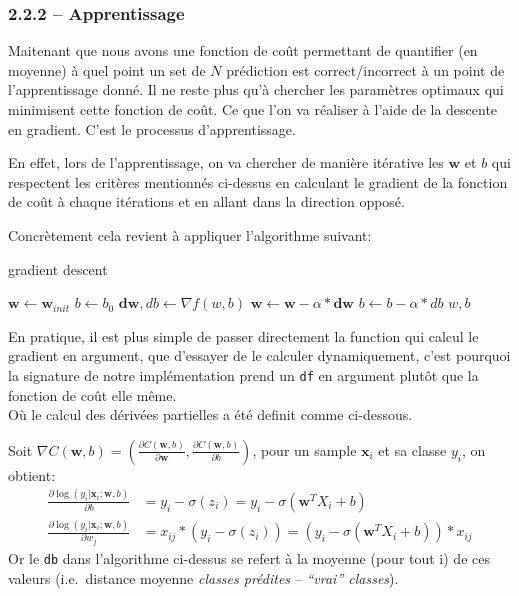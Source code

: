\documentclass[
]{article}
\begin{document}
\hypertarget{apprentissage}{%
\subsubsection{2.2.2 -- Apprentissage}\label{apprentissage}}

Maitenant que nous avons une fonction de coût permettant de quantifier
(en moyenne) à quel point un set de \(N\) prédiction est
correct/incorrect à un point de l'apprentissage donné. Il ne reste plus
qu'à chercher les paramètres optimaux qui minimisent cette fonction de
coût. Ce que l'on va réaliser à l'aide de la descente en gradient. C'est
le processus d'apprentissage.

En effet, lors de l'apprentissage, on va chercher de manière itérative
les \(\mathbf{w}\) et \(b\) qui respectent les critères mentionnés
ci-dessus en calculant le gradient de la fonction de coût à chaque
itérations et en allant dans la direction opposé.

Concrètement cela revient à appliquer l'algorithme suivant:

\begin{algorithm}
\caption{gradient descent}\label{alg:grad_desc}
\begin{algorithmic}
\State $\mathbf{w}\gets \mathbf{w}_{init}$
\State $b \gets b_0$
    \State $\mathbf{dw}, db \gets \nabla{f(w, b)} $
    \State $\mathbf{w}\gets \mathbf{w}- \alpha*\mathbf{dw}$
    \State $b \gets b - \alpha*db$
\EndFor
\State \Return $w, b$
\EndFunction
\end{algorithmic}
\end{algorithm}

En pratique, il est plus simple de passer directement la function qui
calcul le gradient en argument, que d'essayer de le calculer
dynamiquement, c'est pourquoi la signature de notre implémentation prend
un \texttt{df} en argument plutôt que la fonction de coût elle même.\\
Où le calcul des dérivées partielles a été definit comme ci-dessous.

Soit
\(\nabla C(\mathbf{w},b) = (\frac{\partial C(\mathbf{w},b)}{\partial \mathbf{w}}, \frac{\partial C(\mathbf{w},b)}{\partial b} )\),
pour un sample \(\mathbf{x}_i\) et sa classe \(y_i\), on obtient:
\begin{align*}
\frac{\partial \log(y_i|\mathbf{x}_i ; \mathbf{w}, b)}{\partial b} 
&= y_i - \sigma(z_i) 
= y_i - \sigma(\mathbf{w}^T X_i + b)\\
%
\frac{\partial \log(y_i|\mathbf{x}_i ; \mathbf{w}, b)}{\partial w_j} 
&= x_{ij}* ( y_i - \sigma(z_i)) 
= (y_i - \sigma(\mathbf{w}^T X_i + b)) * x_{ij}
\end{align*} Or le \texttt{db} dans l'algorithme ci-dessus se refert à
la moyenne (pour tout i) de ces valeurs (i.e.~distance moyenne
\emph{classes prédites} -- \emph{``vrai'' classes}).
\end{document}
